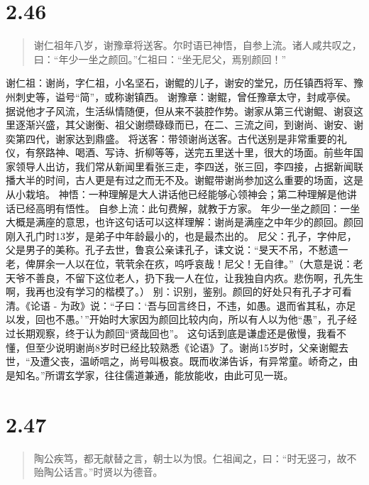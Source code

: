 \documentclass[]{book}
\begin{document}
\section{2.46}\label{section-92}

\begin{quote}
谢仁祖年八岁，谢豫章将送客。尔时语已神悟，自参上流。诸人咸共叹之，曰：``年少一坐之颜回。''仁祖曰：``坐无尼父，焉别颜回！''
\end{quote}

谢仁祖：谢尚，字仁祖，小名坚石，谢鲲的儿子，谢安的堂兄，历任镇西将军、豫州刺史等，谥号``简''，或称谢镇西。
谢豫章：谢鲲，曾任豫章太守，封咸亭侯。据说他才子风流，生活纵情随便，但从来不装腔作势。谢家从第三代谢鲲、谢裒这里逐渐兴盛，其父谢衡、祖父谢缵碌碌而已，在二、三流之间，到谢尚、谢安、谢奕第四代，谢家达到鼎盛。
将送客：带领谢尚送客。古代送别是非常重要的礼仪，有祭路神、喝酒、写诗、折柳等等，送完五里送十里，很大的场面。前些年国家领导人出访，我们常从新闻里看张三走，李四送，张三回，李四接，占据新闻联播大半的时间，古人更是有过之而无不及。谢鲲带谢尚参加这么重要的场面，这是从小栽培。
神悟：一种理解是大人讲话他已经能够心领神会；第二种理解是他讲话已经高明有悟性。
自参上流：此句费解，就教于方家。
年少一坐之颜回：一坐大概是满座的意思，也许这句话可以这样理解：谢尚是满座之中年少的颜回。颜回刚入孔门时13岁，是弟子中年龄最小的，也是最杰出的。
尼父：孔子，字仲尼，父是男子的美称。孔子去世，鲁哀公亲诔孔子，诔文说：``旻天不吊，不慭遗一老，俾屏余一人以在位，茕茕余在疚，呜呼哀哉！尼父！无自律。''（大意是说：老天爷不善良，不留下这位老人，扔下我一人在位，让我独自内疚。悲伤啊，孔先生啊，我再也没有学习的楷模了。）
别：识别，鉴别。颜回的好处只有孔子才可看清。《论语 -
为政》说：``子曰：`吾与回言终日，不违，如愚。退而省其私，亦足以发，回也不愚。'\,''开始时大家因为颜回比较内向，所以有人以为他``愚''，孔子经过长期观察，终于认为颜回``贤哉回也''。
这句话到底是谦虚还是傲慢，我看不懂，但至少说明谢尚8岁时已经比较熟悉《论语》了。谢尚15岁时，父亲谢鲲去世，``及遭父丧，温峤唁之，尚号叫极哀。既而收涕告诉，有异常童。峤奇之，由是知名。''所谓玄学家，往往儒道兼通，能放能收，由此可见一斑。

\section{2.47}\label{section-93}

\begin{quote}
陶公疾笃，都无献替之言，朝士以为恨。仁祖闻之，曰：``时无竖刁，故不贻陶公话言。''时贤以为德音。
\end{quote}
\end{document}
